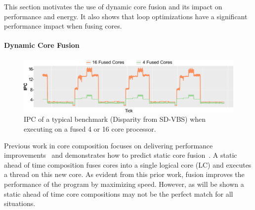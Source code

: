 This section motivates the use of dynamic core fusion and its impact on performance and energy.
It also shows that loop optimizations have a significant performance impact when fusing cores.

\paragraph{Dynamic Core Fusion}
\begin{figure}[t]
    \centering
    \includegraphics[width=\textwidth]{cases-paper/graphics/motivation/disp_opt_4_16_3.pdf}
    \caption{IPC of a typical benchmark (Disparity from SD-VBS) when executing on a fused 4 or 16 core processor.} 
    \label{fig:disp_ex}
\end{figure}




Previous work in core composition focuses on delivering performance improvements~\cite{ipek2007CoreFusion,kim2007tflex} and demonstrates how to predict static core fusion~\cite{micolet2016dmpstream}.
A static ahead of time composition fuses cores into a single logical core (LC) and executes a thread on this new core.
As evident from this prior work, fusion improves the performance of the program by maximizing speed.
However, as will be shown a static ahead of time core compositions may not be the perfect match for all situations.

